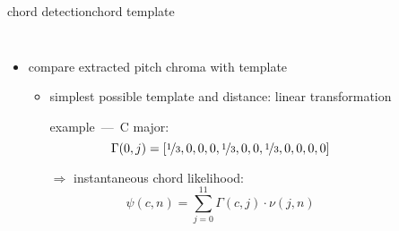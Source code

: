        \begin{frame}{chord detection}{chord template}
            \vspace{-4mm}
            \begin{columns}
            \begin{itemize}
                \item compare extracted pitch chroma with template
                    \begin{itemize}
                        \item	simplest possible template and distance: linear transformation  
                    
                            example~---~C major: \[\Gamma(0,j) = [\nicefrac{1}{3},0,0,0,\nicefrac{1}{3},0,0,\nicefrac{1}{3},0,0,0,0]\]
                        \smallskip
                        \item[$\Rightarrow$]	instantaneous chord likelihood:
                        \begin{equation*}
                            {\psi}(c,n) = \sum\limits_{j = 0}^{11}{\Gamma(c,j)\cdot \nu(j,n)}
                        \end{equation*}
                    \end{itemize}	
            \end{itemize}
            \end{columns}
        \end{frame}
        
